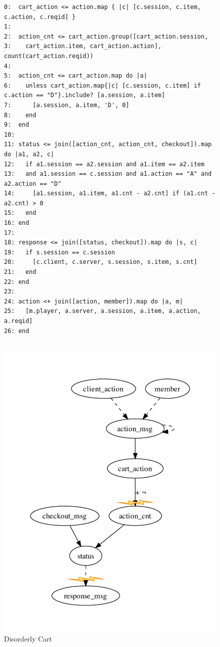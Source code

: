 \begin{figure}[t]
\begin{scriptsize}
\begin{verbatim}
0:  cart_action <= action.map { |c| [c.session, c.item, c.action, c.reqid] }
1:
2:  action_cnt <= cart_action.group([cart_action.session, 
3:    cart_action.item, cart_action.action], count(cart_action.reqid))
4:
5:  action_cnt <= cart_action.map do |a| 
6:    unless cart_action.map{|c| [c.session, c.item] if c.action == "D"}.include? [a.session, a.item] 
7:      [a.session, a.item, 'D', 0]
8:    end 
9:  end
10: 
11: status <= join([action_cnt, action_cnt, checkout]).map do |a1, a2, c| 
12:   if a1.session == a2.session and a1.item == a2.item 
13:   and a1.session == c.session and a1.action == "A" and a2.action == "D"
14:     [a1.session, a1.item, a1.cnt - a2.cnt] if (a1.cnt - a2.cnt) > 0
15:   end
16: end
17:
18: response <= join([status, checkout]).map do |s, c| 
19:   if s.session == c.session
20:     [c.client, c.server, s.session, s.item, s.cnt]
21:   end
22: end
23: 
24: action <+ join([action, member]).map do |a, m|
25:   [m.player, a.server, a.session, a.item, a.action, a.reqid]
26: end


\end{verbatim}
\end{scriptsize}

\centering
\includegraphics[width=0.7\linewidth]{fig/disorderly.pdf}
\caption{Disorderly Cart}
\label{fig:pdg-disorderly}
\end{figure}


